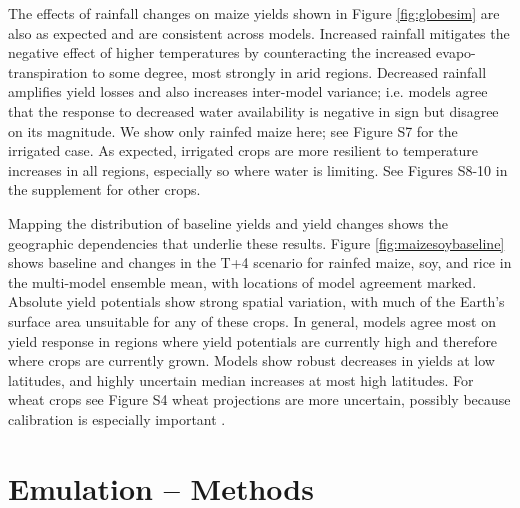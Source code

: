 \documentclass[esd, manuscript]{copernicus} %
\begin{document}
The effects of rainfall changes on maize yields shown in Figure \ref{fig:globesim} are also as expected and are consistent across models. Increased rainfall mitigates the negative effect of higher temperatures by counteracting the increased evapo-transpiration to some degree, most strongly in arid regions.
Decreased rainfall amplifies yield losses and also increases inter-model variance; i.e. models agree that the response to decreased water availability is negative in sign but disagree on its magnitude.
We show only rainfed maize here; see Figure S7 for the irrigated case. As expected, irrigated crops are more resilient to temperature increases in all regions, especially so where water is limiting. See Figures S8-10 in the supplement for other crops.   

Mapping the distribution of baseline yields and yield changes shows the geographic dependencies that underlie these results. Figure \ref{fig:maizesoybaseline} shows baseline and changes in the T+4 scenario for rainfed maize, soy, and rice in the multi-model ensemble mean, with locations of model agreement marked. Absolute yield potentials show strong spatial variation, with much of the Earth's surface area unsuitable for any of these crops. In general, models agree most on yield response in regions where yield potentials are currently high and therefore where crops are currently grown. Models show robust decreases in yields at low latitudes, and highly uncertain median increases at most high latitudes. For wheat crops see Figure S4 wheat projections are more uncertain, possibly because calibration is especially important \citep[e.g.][]{Asseng2013}.

\section{Emulation -- Methods}
\label{S:4}
\end{document}
